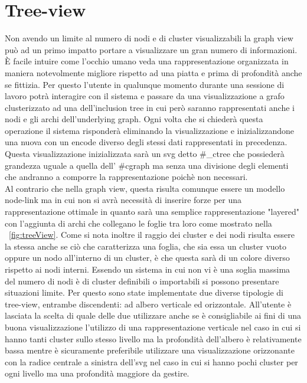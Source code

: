 {\section{Tree-view}
Non avendo un limite al numero di nodi e di cluster visualizzabili la graph view può ad un primo impatto portare a visualizzare un gran numero di informazioni. È facile intuire come l'occhio umano veda una rappresentazione organizzata in maniera notevolmente migliore rispetto ad una piatta e prima di profondità anche se fittizia. Per questo l'utente in qualunque momento durante una sessione di lavoro potrà interagire con il sistema e passare da una visualizzazione a grafo clusterizzato ad una dell'inclusion tree in cui però saranno rappresentati anche i nodi e gli archi dell'underlying graph.
Ogni volta che si chiederà questa operazione il sistema risponderà eliminando la visualizzazione e inizializzandone una nuova con un encode diverso degli stessi dati rappresentati in precedenza. Questa visualizzazione inizializzata sarà un svg detto \#\_ctree che possiederà grandezza uguale a quella dell' \#cgraph ma senza una divisione degli elementi che andranno a comporre la rappresentazione poichè non necessari.\\
Al contrario che nella graph view, questa risulta comunque essere un modello node-link ma in cui non si avrà necessità di inserire forze per una rappresentazione ottimale in quanto sarà una semplice rappresentazione "layered" con l'aggiunta di archi che collegano le foglie tra loro come mostrato nella \figurename~\ref{fig:treeView}.
Come si nota inoltre il raggio dei cluster e dei nodi risulta essere la stessa anche se ciò che caratterizza una foglia, che sia essa un cluster vuoto oppure un nodo all'interno di un cluster, è che questa sarà di un colore diverso rispetto ai nodi interni.
Essendo un sistema in cui non vi è una soglia massima del numero di nodi è di cluster definibili o importabili si possono presentare situazioni limite. Per questo sono state implementate due diverse tipologie di tree-view, entrambe discendenti: ad albero verticale ed orizzontale.
All'utente è lasciata la scelta di quale delle due utilizzare anche se è consigliabile ai fini di una buona visualizzazione l'utilizzo di una rappresentazione verticale nel caso in cui si hanno tanti cluster sullo stesso livello ma la profondità dell'albero è relativamente bassa mentre è sicuramente preferibile utilizzare una visualizzazione orizzonante con la radice centrale a sinistra dell'svg nel caso in cui si hanno pochi cluster per ogni livello ma una profondità maggiore da gestire.
}
